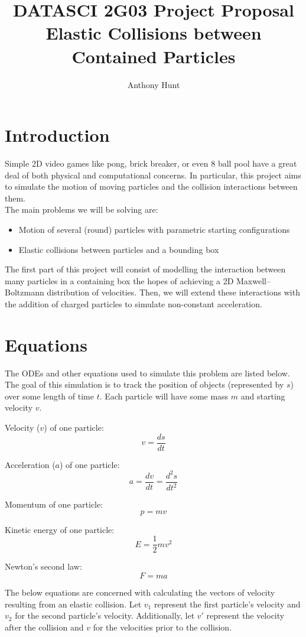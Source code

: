 \documentclass{article}
\title{DATASCI 2G03 Project Proposal \\\large
Elastic Collisions between Contained Particles}
\author{Anthony Hunt}
\begin{document}
\maketitle

\section*{Introduction}
Simple 2D video games like pong, brick breaker, or even 8 ball pool have a great deal of both physical and computational concerns. In particular, this project aims to simulate the motion of moving particles and the collision interactions between them.
\\
The main problems we will be solving are:

\begin{itemize}
    \item Motion of several (round) particles with parametric starting configurations
    \item Elastic collisions between particles and a bounding box
\end{itemize}

The first part of this project will consist of modelling the interaction between many particles in a containing box the hopes of achieving a 2D Maxwell–Boltzmann distribution of velocities. Then, we will extend these interactions with the addition of charged particles to simulate non-constant acceleration.


\section*{Equations}
The ODEs and other equations used to simulate this problem are listed below. The goal of this simulation is to track the position of objects (represented by $s$) over some length of time $t$. Each particle will have some mass $m$ and starting velocity $v$.

Velocity ($v$) of one particle:
$$v = \frac{ds}{dt}$$

Acceleration ($a$) of one particle:
$$a = \frac{dv}{dt} = \frac{d^2s}{dt^2}$$

Momentum of one particle:
$$p = mv$$

Kinetic energy of one particle:
$$E = \frac{1}{2}mv^2$$

Newton's second law:
$$F = ma$$

The below equations are concerned with calculating the vectors of velocity resulting from an elastic collision. Let $v_1$ represent the first particle's velocity and $v_2$ for the second particle's velocity. Additionally, let $v'$ represent the velocity after the collision and $v$ for the velocities prior to the collision.
\end{document}
